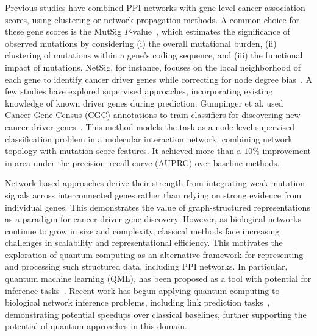 \documentclass[
  reprint,
  superscriptaddress,
  amsmath,amssymb,
  aps,prl,
]{revtex4-2}
\begin{document}
Previous studies have combined PPI networks with gene-level cancer association scores, using clustering or network propagation methods.
%
A common choice for these gene scores is the MutSig \(P\)-value~\cite{lohr2012discovery, lawrence2014discovery}, which estimates the significance of observed mutations by considering (i) the overall mutational burden, (ii) clustering of mutations within a gene’s coding sequence, and (iii) the functional impact of mutations.
NetSig, for instance, focuses on the local neighborhood of each gene to identify cancer driver genes while correcting for node degree bias~\cite{horn2018netsig}.
A few studies have explored supervised approaches, incorporating existing knowledge of known driver genes during prediction. Gumpinger et al. used Cancer Gene Census (CGC) annotations to train classifiers for discovering new cancer driver genes~\cite{gumpinger2020prediction}. This method models the task as a node-level supervised classification problem in a molecular interaction network, combining network topology with mutation-score features. It achieved more than a \(10\%\) improvement in area under the precision–recall curve (AUPRC) over baseline methods.

Network-based approaches derive their strength from integrating weak mutation signals across interconnected genes rather than relying on strong evidence from individual genes. This demonstrates the value of graph-structured representations as a paradigm for cancer driver gene discovery.
%
However, as biological networks continue to grow in size and complexity, classical methods face increasing challenges in scalability and representational efficiency. This motivates the exploration of quantum computing as an alternative framework for representing and processing such structured data, including PPI networks.
% 
In particular, quantum machine learning (QML), has been proposed as a tool with potential for inference tasks~\cite{wittek2014quantum, schuld2015introduction, biamonte2017quantum, park2020theory}.
%
Recent work has begun applying quantum computing to biological network inference problems, including link prediction tasks~\cite{moutinho2023quantum, magano2023quantum, moutinho2024complexity}, demonstrating potential speedups over
classical baselines, further supporting the potential of quantum approaches in this domain. %
\end{document}
